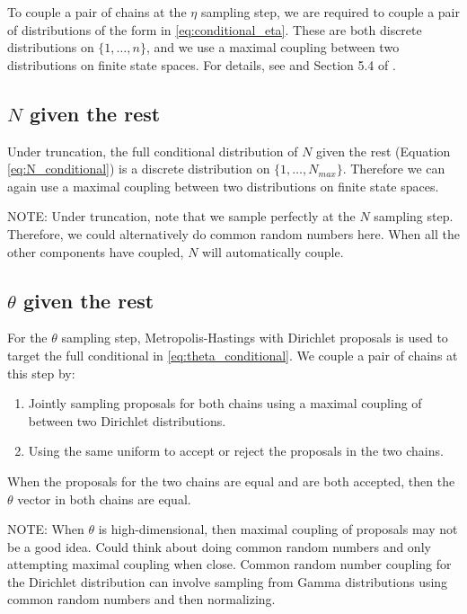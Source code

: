 \documentclass[ba]{imsart}
\begin{document}
To couple a pair of chains at the \texorpdfstring{$\eta$}{eta} sampling step, we are required to couple a pair of distributions of the form in \eqref{eq:conditional_eta}. These are both discrete distributions on $\{1,\ldots,n\}$, and we use a maximal coupling between two distributions on finite state spaces. For details, see \citet{valen_johnson_1996} and Section 5.4 of \citet{jacob2017unbiased}. 


\subsection{\texorpdfstring{$N$}{N} given the rest}
Under truncation, the full conditional distribution of $N$ given the rest (Equation \eqref{eq:N_conditional}) is a discrete distribution on $\{1,\ldots,N_{max}\}$. Therefore we can again use a maximal coupling between two distributions on finite state spaces. 

{\color{red} NOTE: Under truncation, note that we sample perfectly at the $N$ sampling step. Therefore, we could alternatively do common random numbers here. When all the other components have coupled, $N$ will automatically couple.}

\subsection{\texorpdfstring{$\theta$}{theta} given the rest}
For the $\theta$ sampling step, Metropolis-Hastings with Dirichlet proposals is used to target the full conditional in \eqref{eq:theta_conditional}. We couple a pair of chains at this step by:
\begin{enumerate}
    \item Jointly sampling proposals for both chains using a maximal coupling of between two Dirichlet distributions. 
    \item Using the same uniform to accept or reject the proposals in the two chains.
\end{enumerate}

When the proposals for the two chains are equal and are both accepted, then the $\theta$ vector in both chains are equal. 

{\color{red} NOTE: When $\theta$ is high-dimensional, then maximal coupling of proposals may not be a good idea. Could think about doing common random numbers and only attempting maximal coupling when close. Common random number coupling for the Dirichlet distribution can involve sampling from Gamma distributions using common random numbers and then normalizing.}
\end{document}
